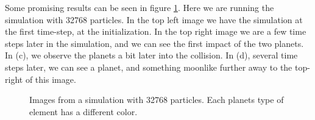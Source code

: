 \documentclass[a4paper]{article}
\begin{document}
Some promising results can be seen in figure \ref{fig:sim}. Here we are running the simulation with 32768 particles. In the top left image we have the simulation at the first time-step, at the initialization. In the top right image we are a few time steps later in the simulation, and we can see the first impact of the two planets. In (c), we observe the planets a bit later into the collision. In (d), several time steps later, we can see a planet, and something moonlike further away to the top-right of this image.

\begin{figure}[h]%
    \centering
     \qquad
    \qquad
    \qquad
    \caption{Images from a simulation with 32768 particles. Each planets type of element has a different color.}%
    \label{fig:sim}%
\end{figure}
\end{document}
